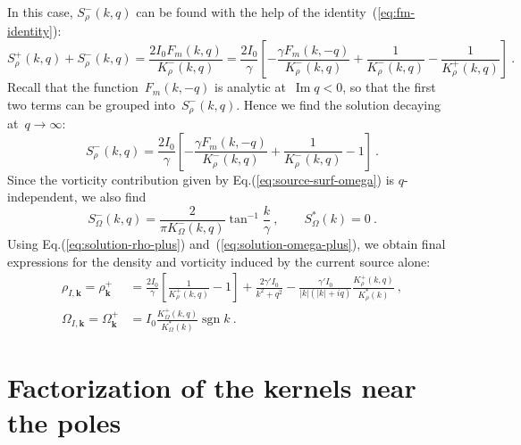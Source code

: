 \documentclass[preprint,aps,eqsecnum]{revtex4-1}
\newcommand{\fplus}[1]{{#1}^{+}}
\newcommand{\fminus}[1]{{#1}^{-}}
\renewcommand{\Im}{\mathop{\mathrm{Im}}\nolimits}
\newcommand{\sgn}{\mathop{\mathrm{sgn}}\nolimits}
\begin{document}
In this case, $\fminus{S}_\rho(k, q)$ can be
found with the help of the identity~(\ref{eq:fm-identity}):
\begin{equation}
\fplus{S}_\rho(k,q) + \fminus{S}_\rho(k, q) = \frac{2 I_0 F_m(k, q)}{\fminus{K}_\rho(k, q)}
= \frac{2I_0}{\gamma}
\left[ -  \frac{\gamma F_m(k, -q)}{\fminus{K}_\rho(k, q)}
+ \frac{1}{\fminus{K}_\rho(k, q)}  -  \frac{1}{\fplus{K}_\rho(k, q)}\right]
\  .
\end{equation}
Recall that the function~$F_m(k, -q)$ is analytic at~$\Im q < 0$,
so that the first two terms can be grouped into~$\fminus{S}_\rho(k, q)$.
Hence we find the solution decaying at~$q\to \infty$:
\begin{equation}
\fminus{S}_\rho(k, q) = \frac{2I_0}{\gamma}
\left[ - \frac{\gamma F_m(k, -q)}{\fminus{K}_\rho(k, q)}
       + \frac{1}{\fminus{K}_\rho(k, q)} - 1
\right]
\ .
\end{equation}
Since the vorticity contribution given by Eq.(\ref{eq:source-surf-omega})
is $q$-independent, we also find
\begin{equation}
  \fminus{S}_\Omega(k, q) = \frac{2}{\pi \fminus{K}_\Omega(k, q)}
  \tan^{-1}\frac{k}{\gamma}
  \ , \qquad S_\Omega^\ast(k) = 0
\ .
\end{equation}
Using Eq.(\ref{eq:solution-rho-plus}) and~(\ref{eq:solution-omega-plus}),
we obtain final expressions for
the density and vorticity induced by the current source alone:
\begin{align}
  \label{eq:rho-I}
\rho_{I, {\bm k}} = \fplus{\rho}_{\bm k}
&= \frac{2 I_0}{\gamma}\left[\frac{1}{\fplus{K}_\rho(k, q)} - 1\right]
+ \frac{2 \gamma' I_0}{k^2 + q^2}
  - \frac{\gamma' I_0}{|k|(|k| + iq)} \frac{\fplus{K}_\rho(k, q)}{K_\rho^\ast(k)}
  \ ,
  \\
  \label{eq:omega-I}
\Omega_{I, {\bm k}} = \fplus{\Omega}_{\bm k}
&= I_0 \frac{\fplus{K}_\Omega(k, q)}{K_\Omega^\ast(k)}  \sgn{k} \ .
\end{align}

\section{Factorization of the kernels near the poles}
\end{document}
